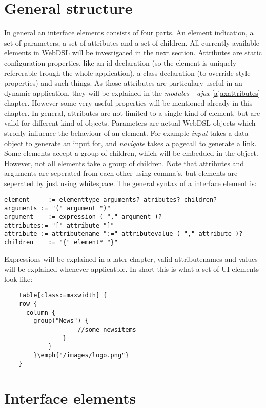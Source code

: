 \section{General structure}
In general an interface elements consists of four parts. An element indication, a set of parameters, a set of attributes and a set of children. All currently available elements in WebDSL will be investigated in the next section. Attributes are static configuration properties, like an id declaration (so the element is uniquely refererable trough the whole application), a class declaration (to override style properties) and such things. As those attributes are particulary useful in an dynamic application, they will be explained in the \emph{modules - ajax} \ref{ajaxattributes} chapter. However some very useful properties will be mentioned already in this chapter. In general, attributes are not limited to a single kind of element, but are valid for different kind of objects.
Parameters are actual WebDSL objects which stronly influence the behaviour of an element. For example \emph{input} takes a data object to generate an input for, and \emph{navigate} takes a pagecall to generate a link. 
Some elements accept a group of children, which will be embedded in the object. However, not all elements take a group of children. Note that attributes and arguments are seperated from each other using comma's, but elements are seperated by just using whitespace. 
The general syntax of a interface element is:
\begin{lstlisting}
element		:= elementtype arguments? atributes? children?
arguments := "(" argument ")"
argument	:= expression ( "," argument )?
attributes:= "[" attribute "]"
attribute := attributename ":=" attributevalue ( "," attribute )?
children	:= "{" element* "}"
\end{lstlisting}
Expressions will be explained in a later chapter, valid attributenames and values will be explained whenever applicatble. In short this is what a set of UI elements look like:
\begin{lstlisting}
	table[class:=maxwidth] {
    row {
      column {
        group("News") {
					//some newsitems
				}
			}
		}\emph{"/images/logo.png"}
	}
\end{lstlisting}

\section{Interface elements}
